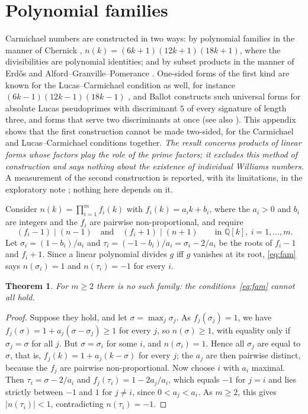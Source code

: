 \documentclass[11pt]{amsart}
\newtheorem{theorem}{Theorem}[section]
\theoremstyle{definition}
\theoremstyle{remark}
\begin{document}
\appendix

\section{Polynomial families}\label{sec:obstr}

Carmichael numbers are constructed in two ways: by polynomial families in the manner of Chernick \cite{Chernick39}, $n(k)=(6k+1)(12k+1)(18k+1)$, where the divisibilities are polynomial identities; and by subset products in the manner of Erd\H{o}s and Alford--Granville--Pomerance \cite{Erdos56,AGP94,LN96}. One-sided forms of the first kind are known for the Lucas--Carmichael condition as well, for instance $(6k-1)(12k-1)(18k-1)$ \cite[Lemma~4.1]{TM23}, and Ballot \cite{Ballot26} constructs such universal forms for absolute Lucas pseudoprimes with discriminant $5$ of every signature of length three, and forms that serve two discriminants at once (see also \cite{HW24}). This appendix shows that the first construction cannot be made two-sided, for the Carmichael and Lucas--Carmichael conditions together. \emph{The result concerns products of linear forms whose factors play the role of the prime factors; it excludes this method of construction and says nothing about the existence of individual Williams numbers.} A measurement of the second construction is reported, with its limitations, in the exploratory note \cite{Supp}; nothing here depends on it.

Consider $n(k)=\prod_{i=1}^m f_i(k)$ with $f_i(k)=a_ik+b_i$, where the $a_i>0$ and $b_i$ are integers and the $f_i$ are pairwise non-proportional, and require
\begin{equation}\label{eq:fam}
(f_i-1)\mid(n-1)\quad\text{and}\quad(f_i+1)\mid(n+1)\qquad\text{in }\mathbb Q[k],\ i=1,\dots,m.
\end{equation}
Let $\sigma_i=(1-b_i)/a_i$ and $\tau_i=(-1-b_i)/a_i=\sigma_i-2/a_i$ be the roots of $f_i-1$ and $f_i+1$. Since a linear polynomial divides $g$ iff $g$ vanishes at its root, \eqref{eq:fam} says $n(\sigma_i)=1$ and $n(\tau_i)=-1$ for every $i$.

\begin{theorem}\label{thm:fam}
For $m\ge2$ there is no such family: the conditions~\eqref{eq:fam} cannot all hold.
\end{theorem}
\begin{proof}
Suppose they hold, and let $\sigma=\max_j\sigma_j$. As $f_j(\sigma_j)=1$, we have $f_j(\sigma)=1+a_j(\sigma-\sigma_j)\ge1$ for every $j$, so $n(\sigma)\ge1$, with equality only if $\sigma_j=\sigma$ for all $j$. But $\sigma=\sigma_i$ for some $i$, and $n(\sigma_i)=1$. Hence all $\sigma_j$ are equal to $\sigma$, that is, $f_j(k)=1+a_j(k-\sigma)$ for every $j$; the $a_j$ are then pairwise distinct, because the $f_j$ are pairwise non-proportional. Now choose $i$ with $a_i$ maximal. Then $\tau_i=\sigma-2/a_i$ and $f_j(\tau_i)=1-2a_j/a_i$, which equals $-1$ for $j=i$ and lies strictly between $-1$ and $1$ for $j\ne i$, since $0<a_j<a_i$. As $m\ge2$, this gives $|n(\tau_i)|<1$, contradicting $n(\tau_i)=-1$.
\end{proof}
\end{document}
